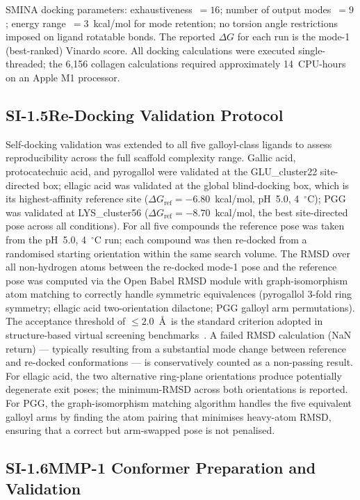 \documentclass[11pt]{article}
\begin{document}
SMINA docking parameters: exhaustiveness~$= 16$; number of output modes~$= 9$;
energy range~$= 3$~kcal/mol for mode retention; no torsion angle restrictions
imposed on ligand rotatable bonds.
The reported $\Delta G$ for each run is the mode-1 (best-ranked) Vinardo score.
All docking calculations were executed single-threaded; the 6,156 collagen
calculations required approximately 14~CPU-hours on an Apple M1 processor.

\subsection*{SI-1.5\quad Re-Docking Validation Protocol}

Self-docking validation was extended to all five galloyl-class ligands to
assess reproducibility across the full scaffold complexity range.
Gallic acid, protocatechuic acid, and pyrogallol were validated at the
GLU\_cluster22 site-directed box; ellagic acid was validated at the global
blind-docking box, which is its highest-affinity reference site
($\Delta G_\mathrm{ref} = -6.80$~kcal/mol, pH~5.0, 4~$^\circ$C);
PGG was validated at LYS\_cluster56 ($\Delta G_\mathrm{ref} = -8.70$~kcal/mol,
the best site-directed pose across all conditions).
For all five compounds the reference pose was taken from the pH~5.0,
4~$^\circ$C run; each compound was then re-docked from a randomised starting
orientation within the same search volume.
The RMSD over all non-hydrogen atoms between the re-docked mode-1 pose and
the reference pose was computed via the Open Babel RMSD module with
graph-isomorphism atom matching to correctly handle symmetric equivalences
(pyrogallol 3-fold ring symmetry; ellagic acid two-orientation dilactone;
PGG galloyl arm permutations).
The acceptance threshold of $\leq 2.0$~\AA\ is the standard criterion
adopted in structure-based virtual screening benchmarks~\cite{warren2006critical}.
A failed RMSD calculation (NaN return) --- typically resulting from a
substantial mode change between reference and re-docked conformations ---
is conservatively counted as a non-passing result.
For ellagic acid, the two alternative ring-plane orientations produce
potentially degenerate exit poses; the minimum-RMSD across both orientations
is reported.
For PGG, the graph-isomorphism matching algorithm handles the five equivalent
galloyl arms by finding the atom pairing that minimises heavy-atom RMSD,
ensuring that a correct but arm-swapped pose is not penalised.

\subsection*{SI-1.6\quad MMP-1 Conformer Preparation and Validation}
\end{document}
